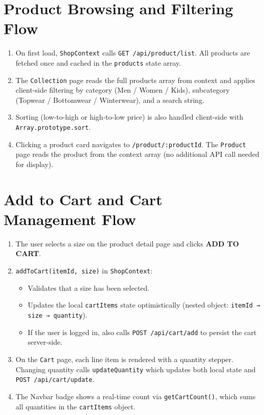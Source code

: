 \documentclass[12pt,a4paper]{report}
\begin{document}
\section{Product Browsing and Filtering Flow}

\begin{enumerate}[leftmargin=*, label=\arabic*.]
  \item On first load, \texttt{ShopContext} calls \texttt{GET /api/product/list}.
        All products are fetched once and cached in the \texttt{products} state array.
  \item The \texttt{Collection} page reads the full products array from context and applies
        client-side filtering by category (Men / Women / Kids), subcategory (Topwear /
        Bottomwear / Winterwear), and a search string.
  \item Sorting (low-to-high or high-to-low price) is also handled client-side with
        \texttt{Array.prototype.sort}.
  \item Clicking a product card navigates to \texttt{/product/:productId}.
        The \texttt{Product} page reads the product from the context array
        (no additional API call needed for display).
\end{enumerate}

\section{Add to Cart and Cart Management Flow}

\begin{enumerate}[leftmargin=*, label=\arabic*.]
  \item The user selects a size on the product detail page and clicks \textbf{ADD TO CART}.
  \item \texttt{addToCart(itemId, size)} in \texttt{ShopContext}:
        \begin{itemize}
          \item Validates that a size has been selected.
          \item Updates the local \texttt{cartItems} state optimistically
                (nested object: \texttt{itemId → size → quantity}).
          \item If the user is logged in, also calls \texttt{POST /api/cart/add} to persist the
                cart server-side.
        \end{itemize}
  \item On the \texttt{Cart} page, each line item is rendered with a quantity stepper.
        Changing quantity calls \texttt{updateQuantity} which updates both local state and
        \texttt{POST /api/cart/update}.
  \item The Navbar badge shows a real-time count via \texttt{getCartCount()}, which sums all
        quantities in the \texttt{cartItems} object.
\end{enumerate}
\end{document}
